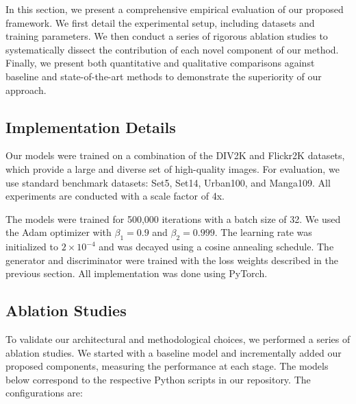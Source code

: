 \documentclass{article}
\begin{document}
In this section, we present a comprehensive empirical evaluation of our proposed framework. We first detail the experimental setup, including datasets and training parameters. We then conduct a series of rigorous ablation studies to systematically dissect the contribution of each novel component of our method. Finally, we present both quantitative and qualitative comparisons against baseline and state-of-the-art methods to demonstrate the superiority of our approach.

\subsection{Implementation Details}
Our models were trained on a combination of the DIV2K \cite{div2k} and Flickr2K datasets, which provide a large and diverse set of high-quality images. For evaluation, we use standard benchmark datasets: Set5, Set14, Urban100, and Manga109. All experiments are conducted with a scale factor of 4x.

The models were trained for 500,000 iterations with a batch size of 32. We used the Adam optimizer with $\beta_1 = 0.9$ and $\beta_2 = 0.999$. The learning rate was initialized to $2 \times 10^{-4}$ and was decayed using a cosine annealing schedule. The generator and discriminator were trained with the loss weights described in the previous section. All implementation was done using PyTorch.

\subsection{Ablation Studies}
To validate our architectural and methodological choices, we performed a series of ablation studies. We started with a baseline model and incrementally added our proposed components, measuring the performance at each stage. The models below correspond to the respective Python scripts in our repository. The configurations are:
\end{document}
